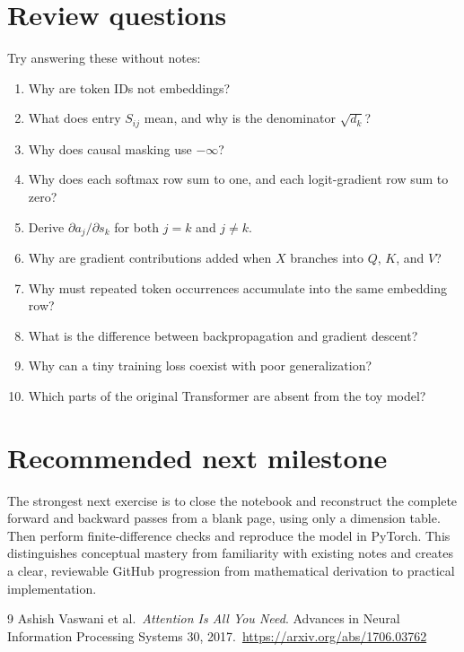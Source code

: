 \documentclass[11pt]{article}
\begin{document}
\section{Review questions}

Try answering these without notes:
\begin{enumerate}
  \item Why are token IDs not embeddings?
  \item What does entry $S_{ij}$ mean, and why is the denominator $\sqrt{d_k}$?
  \item Why does causal masking use $-\infty$?
  \item Why does each softmax row sum to one, and each logit-gradient row sum to zero?
  \item Derive $\partial a_j/\partial s_k$ for both $j=k$ and $j\ne k$.
  \item Why are gradient contributions added when $X$ branches into $Q$, $K$, and $V$?
  \item Why must repeated token occurrences accumulate into the same embedding row?
  \item What is the difference between backpropagation and gradient descent?
  \item Why can a tiny training loss coexist with poor generalization?
  \item Which parts of the original Transformer are absent from the toy model?
\end{enumerate}

\section{Recommended next milestone}

The strongest next exercise is to close the notebook and reconstruct the complete forward and backward passes
from a blank page, using only a dimension table. Then perform finite-difference checks and reproduce the model
in PyTorch. This distinguishes conceptual mastery from familiarity with existing notes and creates a clear,
reviewable GitHub progression from mathematical derivation to practical implementation.

\begin{thebibliography}{9}
Ashish Vaswani et al.\
\emph{Attention Is All You Need}. Advances in Neural Information Processing Systems 30, 2017.\
\url{https://arxiv.org/abs/1706.03762}
\end{thebibliography}
\end{document}
